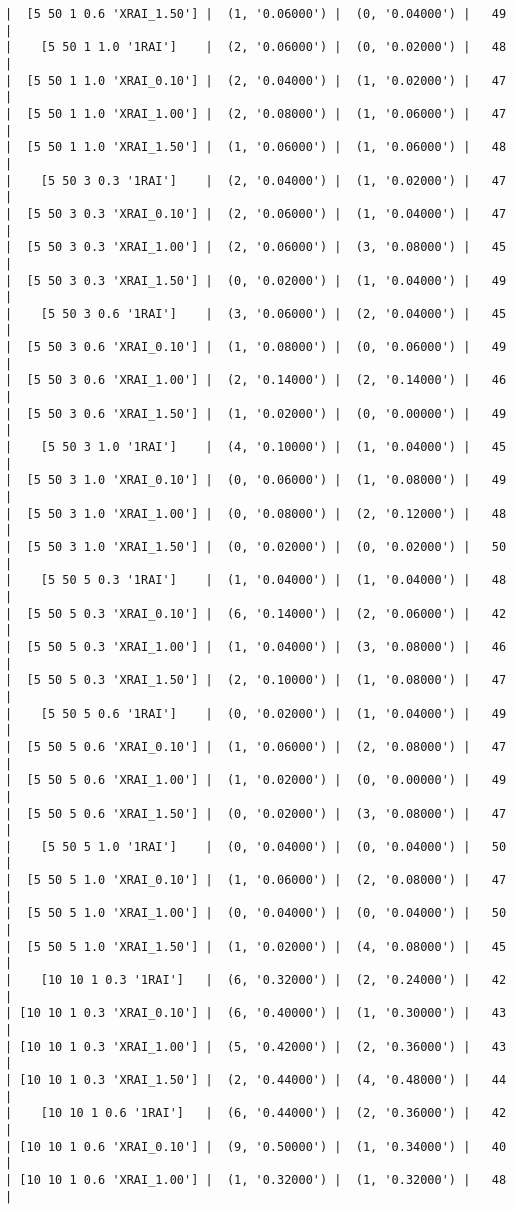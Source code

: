 \documentclass{article}
\begin{document}
\begin{verbatim}
|  [5 50 1 0.6 'XRAI_1.50'] |  (1, '0.06000') |  (0, '0.04000') |   49  |
|    [5 50 1 1.0 '1RAI']    |  (2, '0.06000') |  (0, '0.02000') |   48  |
|  [5 50 1 1.0 'XRAI_0.10'] |  (2, '0.04000') |  (1, '0.02000') |   47  |
|  [5 50 1 1.0 'XRAI_1.00'] |  (2, '0.08000') |  (1, '0.06000') |   47  |
|  [5 50 1 1.0 'XRAI_1.50'] |  (1, '0.06000') |  (1, '0.06000') |   48  |
|    [5 50 3 0.3 '1RAI']    |  (2, '0.04000') |  (1, '0.02000') |   47  |
|  [5 50 3 0.3 'XRAI_0.10'] |  (2, '0.06000') |  (1, '0.04000') |   47  |
|  [5 50 3 0.3 'XRAI_1.00'] |  (2, '0.06000') |  (3, '0.08000') |   45  |
|  [5 50 3 0.3 'XRAI_1.50'] |  (0, '0.02000') |  (1, '0.04000') |   49  |
|    [5 50 3 0.6 '1RAI']    |  (3, '0.06000') |  (2, '0.04000') |   45  |
|  [5 50 3 0.6 'XRAI_0.10'] |  (1, '0.08000') |  (0, '0.06000') |   49  |
|  [5 50 3 0.6 'XRAI_1.00'] |  (2, '0.14000') |  (2, '0.14000') |   46  |
|  [5 50 3 0.6 'XRAI_1.50'] |  (1, '0.02000') |  (0, '0.00000') |   49  |
|    [5 50 3 1.0 '1RAI']    |  (4, '0.10000') |  (1, '0.04000') |   45  |
|  [5 50 3 1.0 'XRAI_0.10'] |  (0, '0.06000') |  (1, '0.08000') |   49  |
|  [5 50 3 1.0 'XRAI_1.00'] |  (0, '0.08000') |  (2, '0.12000') |   48  |
|  [5 50 3 1.0 'XRAI_1.50'] |  (0, '0.02000') |  (0, '0.02000') |   50  |
|    [5 50 5 0.3 '1RAI']    |  (1, '0.04000') |  (1, '0.04000') |   48  |
|  [5 50 5 0.3 'XRAI_0.10'] |  (6, '0.14000') |  (2, '0.06000') |   42  |
|  [5 50 5 0.3 'XRAI_1.00'] |  (1, '0.04000') |  (3, '0.08000') |   46  |
|  [5 50 5 0.3 'XRAI_1.50'] |  (2, '0.10000') |  (1, '0.08000') |   47  |
|    [5 50 5 0.6 '1RAI']    |  (0, '0.02000') |  (1, '0.04000') |   49  |
|  [5 50 5 0.6 'XRAI_0.10'] |  (1, '0.06000') |  (2, '0.08000') |   47  |
|  [5 50 5 0.6 'XRAI_1.00'] |  (1, '0.02000') |  (0, '0.00000') |   49  |
|  [5 50 5 0.6 'XRAI_1.50'] |  (0, '0.02000') |  (3, '0.08000') |   47  |
|    [5 50 5 1.0 '1RAI']    |  (0, '0.04000') |  (0, '0.04000') |   50  |
|  [5 50 5 1.0 'XRAI_0.10'] |  (1, '0.06000') |  (2, '0.08000') |   47  |
|  [5 50 5 1.0 'XRAI_1.00'] |  (0, '0.04000') |  (0, '0.04000') |   50  |
|  [5 50 5 1.0 'XRAI_1.50'] |  (1, '0.02000') |  (4, '0.08000') |   45  |
|    [10 10 1 0.3 '1RAI']   |  (6, '0.32000') |  (2, '0.24000') |   42  |
| [10 10 1 0.3 'XRAI_0.10'] |  (6, '0.40000') |  (1, '0.30000') |   43  |
| [10 10 1 0.3 'XRAI_1.00'] |  (5, '0.42000') |  (2, '0.36000') |   43  |
| [10 10 1 0.3 'XRAI_1.50'] |  (2, '0.44000') |  (4, '0.48000') |   44  |
|    [10 10 1 0.6 '1RAI']   |  (6, '0.44000') |  (2, '0.36000') |   42  |
| [10 10 1 0.6 'XRAI_0.10'] |  (9, '0.50000') |  (1, '0.34000') |   40  |
| [10 10 1 0.6 'XRAI_1.00'] |  (1, '0.32000') |  (1, '0.32000') |   48  |

\end{verbatim}
\end{document}
